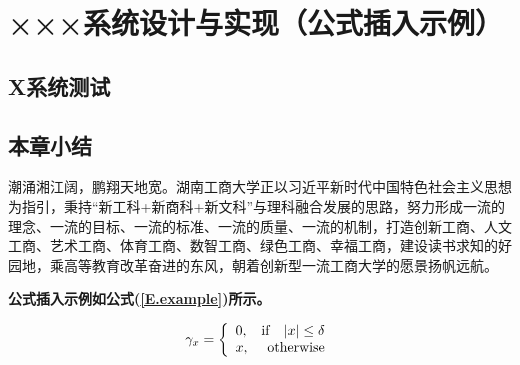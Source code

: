 
\chapter{×××系统设计与实现（公式插入示例）}

\section{X系统测试}

\section{本章小结}

潮涌湘江阔，鹏翔天地宽。湖南工商大学正以习近平新时代中国特色社会主义思想为指引，秉持“新工科+新商科+新文科”与理科融合发展的思路，努力形成一流的理念、一流的目标、一流的标准、一流的质量、一流的机制，打造创新工商、人文工商、艺术工商、体育工商、数智工商、绿色工商、幸福工商，建设读书求知的好园地，乘高等教育改革奋进的东风，朝着创新型一流工商大学的愿景扬帆远航。


\textbf{公式插入示例如公式(\ref{E.example})所示。}

\begin{equation}
	\gamma_{x}=
	\left\{
	\begin{array}{lr}
		0, & {\rm if}~~\;|x| \leq \delta \\
		x, & {\rm otherwise}
	\end{array}
	\right.
	\label{E.example}
\end{equation}


\newpage



